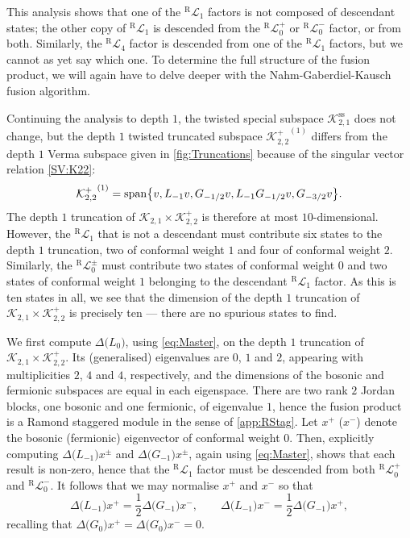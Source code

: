 \documentclass[a4paper,reqno,12pt]{report}
\theoremstyle{definition}
\numberwithin{equation}{section}
\let\originalleft\left     %
\let\originalright\right
\renewcommand{\left}{\mathopen{}\mathclose\bgroup\originalleft}
\renewcommand{\right}{\aftergroup\egroup\originalright}
\newcommand{\set}[1]{\left\{ #1 \right\}}
\newcommand{\Irr}[1]{\mathcal{L}_{#1}}       %
\newcommand{\Kac}[1]{\mathcal{K}_{#1}}       %
\newcommand{\spsub}[1]{#1^{\text{ss}}}       %
\newcommand{\fuse}{\mathbin{\times}}                                            %
\newcommand{\coproductsymb}{\Delta}                                                %
\newcommand{\coproduct}[1]{\coproductsymb \bigl( #1 \bigr)}                        %
\newcommand{\sv}{singular vector}
\newcommand{\NGK}{Nahm-Gaberdiel-Kausch}
\DeclareMathOperator{\vspn}{span}
\theoremstyle{plain}
\newcommand{\RIrr}[1]{{}^{\text{R}}\Irr{#1}}       %
\begin{document}
This analysis shows that one of the $\RIrr{1}$ factors is not composed of descendant states; the other copy of $\RIrr{1}$ is descended from the $\RIrr{0}^+$ or $\RIrr{0}^-$ factor, or from both.  Similarly, the $\RIrr{4}$ factor is descended from one of the $\RIrr{1}$ factors, but we cannot as yet say which one.  To determine the full structure of the fusion product, we will again have to delve deeper with the \NGK{} fusion algorithm.

Continuing the analysis to depth $1$, the twisted special subspace $\spsub{\Kac{2,1}}$ does not change, but the depth $1$ twisted truncated subspace ${\Kac{2,2}^+}^{(1)}$ differs from the depth $1$ Verma subspace given in \cref{fig:Truncations} because of the \sv{} relation \eqref{SV:K22}:
\begin{equation}
{\Kac{2,2}^+}^{(1)} = \vspn \set{v, L_{-1} v, G_{-1/2} v, L_{-1} G_{-1/2} v, G_{-3/2} v}.
\end{equation}
The depth $1$ truncation of $\Kac{2,1} \fuse \Kac{2,2}^+$ is therefore at most $10$-dimensional.  However, the $\RIrr{1}$ that is not a descendant must contribute six states to the depth $1$ truncation, two of conformal weight $1$ and four of conformal weight $2$.  Similarly, the $\RIrr{0}^{\pm}$ must contribute two states of conformal weight $0$ and two states of conformal weight $1$ belonging to the descendant $\RIrr{1}$ factor.  As this is ten states in all, we see that the dimension of the depth $1$ truncation of $\Kac{2,1} \fuse \Kac{2,2}^+$ is precisely ten --- there are no spurious states to find.

We first compute $\coproduct{L_0}$, using \eqref{eq:Master}, on the depth $1$ truncation of $\Kac{2,1} \fuse \Kac{2,2}^+$.  Its (generalised) eigenvalues are $0$, $1$ and $2$, appearing with multiplicities $2$, $4$ and $4$, respectively, and the dimensions of the bosonic and fermionic subspaces are equal in each eigenspace.  There are two rank $2$ Jordan blocks, one bosonic and one fermionic, of eigenvalue $1$, hence the fusion product is a Ramond staggered module in the sense of \cref{app:RStag}.  Let $x^+$ ($x^-$) denote the bosonic (fermionic) eigenvector of conformal weight $0$.  Then, explicitly computing $\coproduct{L_{-1}} x^{\pm}$ and $\coproduct{G_{-1}} x^{\pm}$, again using \eqref{eq:Master}, shows that each result is non-zero, hence that the $\RIrr{1}$ factor must be descended from both $\RIrr{0}^+$ and $\RIrr{0}^-$.  It follows that we may normalise $x^+$ and $x^-$ so that
\begin{equation}
\coproduct{L_{-1}} x^+ = \frac{1}{2} \coproduct{G_{-1}} x^-, \qquad \coproduct{L_{-1}} x^- = \frac{1}{2} \coproduct{G_{-1}} x^+,
\end{equation}
recalling that $\coproduct{G_0} x^+ = \coproduct{G_0} x^- = 0$.
\end{document}
